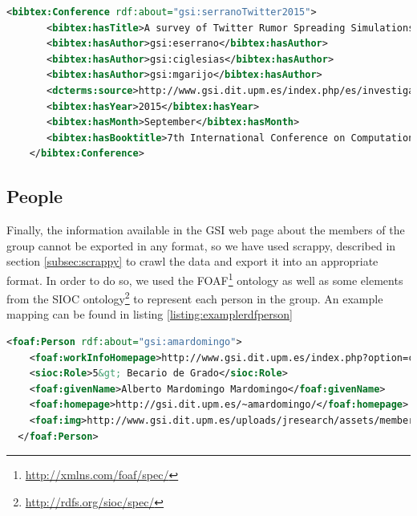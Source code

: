 \begin{center} 
  \begin{lstlisting}[language=XML, captionpos=b, caption=Example bibtex document converted to \ac{RDF}, label=listing:examplerdfbibtex]   
   <bibtex:Conference rdf:about="gsi:serranoTwitter2015">
       <bibtex:hasTitle>A survey of Twitter Rumor Spreading Simulations</bibtex:hasTitle>
       <bibtex:hasAuthor>gsi:eserrano</bibtex:hasAuthor>
       <bibtex:hasAuthor>gsi:ciglesias</bibtex:hasAuthor>
       <bibtex:hasAuthor>gsi:mgarijo</bibtex:hasAuthor>
       <dcterms:source>http://www.gsi.dit.upm.es/index.php/es/investigacion/publicaciones.bibtex?controller=publications&amp;task=export&amp;id=364</dcterms:source>
       <bibtex:hasYear>2015</bibtex:hasYear>
       <bibtex:hasMonth>September</bibtex:hasMonth>
       <bibtex:hasBooktitle>7th International Conference on Computational Collective Intelligence Technologies and Applications</bibtex:hasBooktitle>
    </bibtex:Conference>
 \end{lstlisting}
\end{center}

\subsection{People}

Finally, the information available in the GSI web page about the members of the group cannot be exported in any format, so we have used scrappy, described in section \ref{subsec:scrappy} to crawl the data and export it into an appropriate format. In order to do so, we used the \ac{FOAF}\footnote{\url{http://xmlns.com/foaf/spec/}} ontology as well as some elements from the \ac{SIOC} ontology\footnote{\url{http://rdfs.org/sioc/spec/}} to represent each person in the group. An example mapping can be found in listing \ref{listing:examplerdfperson}

\begin{center} 
  \begin{lstlisting}[language=XML, captionpos=b, caption=Example semantic data about a member of the group, label=listing:examplerdfperson]   
  <foaf:Person rdf:about="gsi:amardomingo">
    <foaf:workInfoHomepage>http://www.gsi.dit.upm.es/index.php?option=com_jresearch&amp;view=member&amp;task=show&amp;id=84</foaf:workInfoHomepage>
    <sioc:Role>5&gt; Becario de Grado</sioc:Role>
    <foaf:givenName>Alberto Mardomingo Mardomingo</foaf:givenName>
    <foaf:homepage>http://gsi.dit.upm.es/~amardomingo/</foaf:homepage>
    <foaf:img>http://www.gsi.dit.upm.es/uploads/jresearch/assets/members/Foto.jpg</foaf:img>
  </foaf:Person>
 \end{lstlisting}
\end{center}

